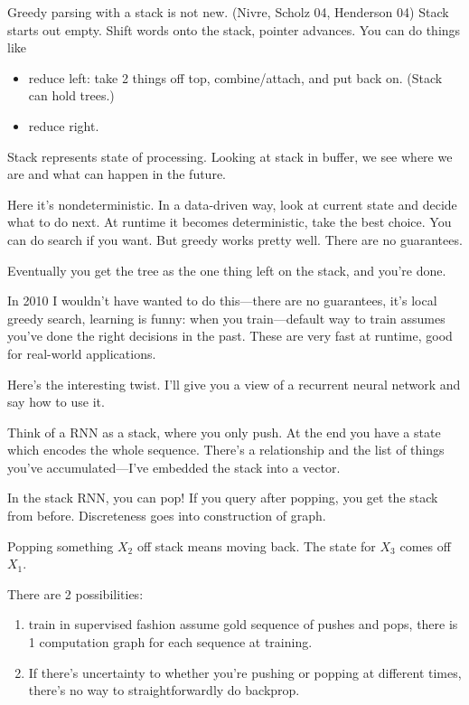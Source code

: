 Greedy parsing with a stack is not new. (Nivre, Scholz 04, Henderson 04) Stack starts out empty. Shift words onto the stack, pointer advances. 
You can do things like
\begin{itemize}
\item
reduce left: take 2 things off top, combine/attach, and put back on. (Stack can hold trees.)
\item
reduce right.
\end{itemize}
Stack represents state of processing. Looking at stack in buffer, we see where we are and what can happen in the future.

Here it's nondeterministic. In a data-driven way, look at current state and decide what to do next. At runtime it becomes deterministic, take the best choice. You can do search if you want. But greedy works pretty well. There are no guarantees.

Eventually you get the tree as the one thing left on the stack, and you're done.

In 2010 I wouldn't have wanted to do this---there are no guarantees, it's local greedy search, learning is funny: when you train---default way to train assumes you've done the right decisions in the past. These are very fast at runtime, good for real-world applications.

Here's the interesting twist. I'll give you a view of a recurrent neural network and say how to use it.

Think of a RNN as a stack, where you only push. At the end you have a state which encodes the whole sequence.
There's a relationship and the list of things you've accumulated---I've embedded the stack into a vector. 

In the stack RNN, you can pop! If you query after popping, you get the stack from before.
Discreteness goes into construction of graph.

Popping something $X_2$ off stack means moving back. The state for $X_3$ comes off $X_1$.

There are 2 possibilities: 
\begin{enumerate}
\item
train in supervised fashion assume gold sequence of pushes and pops, there is 1 computation graph for each sequence at training. 
\item
If there's uncertainty to whether you're pushing or popping at different times, there's no way to straightforwardly do backprop. 
\end{enumerate}

